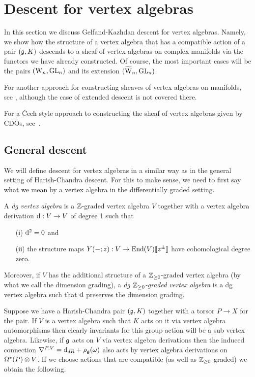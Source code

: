 \section{Descent for vertex algebras} \label{sec vertex desc}

In this section we discuss Gelfand-Kazhdan descent for vertex
algebras. Namely, we show how the structure of a vertex algebra that
has a compatible action of a pair $(\mathfrak g, K)$ descends to a sheaf of
vertex algebras on complex manifolds via the functors we have already
constructed. Of course, the most important cases will be the pairs
$({{\rm W}_n}, {\rm GL}_n)$ and its extension $(\widetilde{{{\rm W}}}_n, {\rm GL}_n)$. 

For another approach for constructing sheaves of vertex algebras on manifolds, 
see \cite{Malikov2008},  although the case of extended descent is not covered there. 

For a \v{C}ech style approach to constructing the sheaf of vertex
algebras given by CDOs, see~\cite{GMS2}. 

\subsection{General descent} 
\label{gendescent}

We will define descent for vertex algebras in a
similar way as in the general setting of Harish-Chandra descent. For this
to make sense, we need to first say what we mean by a vertex algebra
in the differentially graded setting. 

\begin{dfn} 
A {\em dg vertex algebra} is a $\mathbb Z$-graded vertex algebra $V$ 
together with a vertex algebra derivation ${\rm d} : V \to V$ of degree 1 such that
\begin{itemize}
\item[(i)] ${\rm d}^2 = 0$ and
\item[(ii)] the structure maps $Y(-; z) : V \to {\rm End}(V) \llbracket z^\pm \rrbracket$ have cohomological degree zero.
\end{itemize}
Moreover, if $V$ has the additional structure of a $\mathbb Z_{\geq 0}$-graded vertex algebra 
(by what we call the dimension grading), 
a {\em dg $\mathbb Z_{\geq 0}$-graded vertex algebra} is a dg vertex algebra such that
${\rm d}$ preserves the dimension grading. 
\end{dfn}

Suppose we have a Harish-Chandra pair $(\mathfrak g, K)$ together with a
torsor $P \to X$ for the pair. If $V$ is a vertex algebra such that
$K$ acts on it via vertex algebra automorphisms then clearly
invariants for this group action will be a sub vertex
algebra. Likewise, if $\mathfrak g$ acts on $V$ via vertex algebra derivations
then the induced connection $\nabla^{P,V} = {\rm d}_{dR} +
\rho_\mathfrak g(\omega)$ also acts by vertex algebra derivations on
$\Omega^*(P) \otimes V$. If we choose actions that are compatible (as
well as $\mathbb Z_{\geq 0}$ graded) we
obtain the following. 

